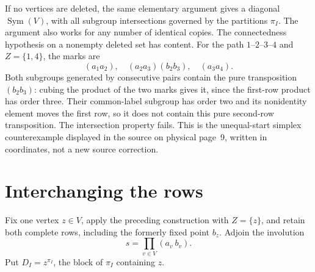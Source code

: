 \documentclass[a4paper,11pt]{article}
\newcommand{\Sym}{\operatorname{Sym}}
\begin{document}
If no vertices are deleted, the same elementary argument gives a diagonal
$\Sym(V)$, with all subgroup intersections governed by the partitions
$\pi_I$. The argument also works for any number of identical copies.
The connectedness hypothesis on a nonempty deleted set has content.
For the path $1$--$2$--$3$--$4$ and $Z=\{1,4\}$, the marks are
\[
 (a_1a_2),\quad(a_2a_3)(b_2b_3),\quad(a_3a_4).
\]
Both subgroups generated by consecutive pairs contain the pure transposition
$(b_2b_3)$: cubing the product of the two marks gives it, since the first-row
product has order three. Their common-label subgroup has order two and its
nonidentity element moves the first row, so it does not contain this pure
second-row transposition. The intersection property fails. This is the
unequal-start simplex counterexample displayed in the source on physical
page~9, written in coordinates, not a new source correction.

\section{Interchanging the rows}
Fix one vertex $z\in V$, apply the preceding construction with $Z=\{z\}$,
and retain both complete rows, including the formerly fixed point $b_z$.
Adjoin the involution
\[
 s=\prod_{v\in V}(a_v\ b_v).
\]
Put $D_I=z^{\pi_I}$, the block of $\pi_I$ containing $z$.
\end{document}
